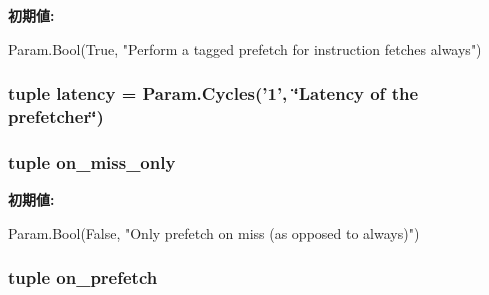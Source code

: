 \label{classPrefetcher_1_1BasePrefetcher_a11272c9ffaf66f5ab8370ae66fe440bf}
{\bfseries 初期値:}
\begin{DoxyCode}
Param.Bool(True,
         "Perform a tagged prefetch for instruction fetches always")
\end{DoxyCode}
\hypertarget{classPrefetcher_1_1BasePrefetcher_ab6371bb71615c96debd0d27d34943fed}{
\subsubsection[{latency}]{\setlength{\rightskip}{0pt plus 5cm}tuple latency = Param.Cycles('1', \char`\"{}Latency of the prefetcher\char`\"{})}}
\label{classPrefetcher_1_1BasePrefetcher_ab6371bb71615c96debd0d27d34943fed}
\hypertarget{classPrefetcher_1_1BasePrefetcher_a111f7ead7904e055617c3a196f4725ae}{
\subsubsection[{on\_\-miss\_\-only}]{\setlength{\rightskip}{0pt plus 5cm}tuple on\_\-miss\_\-only}}
\label{classPrefetcher_1_1BasePrefetcher_a111f7ead7904e055617c3a196f4725ae}
{\bfseries 初期値:}
\begin{DoxyCode}
Param.Bool(False,
         "Only prefetch on miss (as opposed to always)")
\end{DoxyCode}
\hypertarget{classPrefetcher_1_1BasePrefetcher_a4d2de2c48fce59e76568dfcf445e8903}{
\subsubsection[{on\_\-prefetch}]{\setlength{\rightskip}{0pt plus 5cm}tuple on\_\-prefetch}}
\label{classPrefetcher_1_1BasePrefetcher_a4d2de2c48fce59e76568dfcf445e8903}
